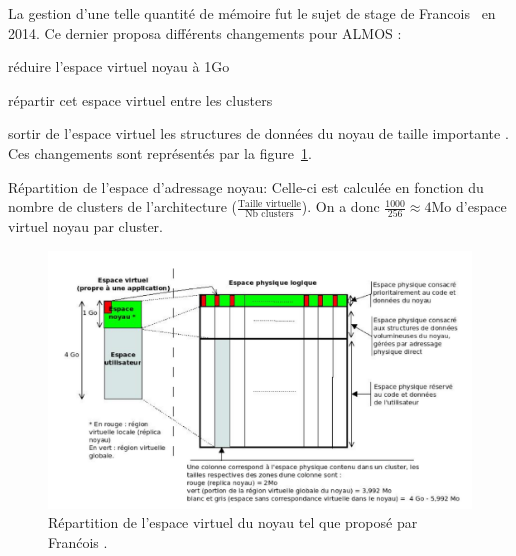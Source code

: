       La gestion d'une telle quantité de mémoire fut le sujet de stage de
      Francois~\citet{guerret2014exploitation} en 2014. Ce dernier proposa
      différents changements pour ALMOS : \benumline \item réduire l'espace
      virtuel noyau à 1Go \item répartir cet espace virtuel entre les
      clusters \item sortir de l'espace virtuel les structures de données du
      noyau de taille importante \eenumline. Ces changements sont représentés
      par la figure~\ref{fig:almos-guerret}.

      \begin{paragraph}{Répartition de l'espace d'adressage noyau:}
        Celle-ci est calculée en fonction du nombre de clusters de
        l'architecture ($\frac{\text{Taille virtuelle}}{\text{Nb
            clusters}}$). On a donc $\frac{1000}{256}\approx4$Mo d'espace
        virtuel noyau par cluster.
      \end{paragraph}

      \begin{figure}[ht]
        \centering \includegraphics[scale=0.3]{include/img/almos-guerret}
        \caption{Répartition de l'espace virtuel du noyau tel que proposé par
          Franćois \citet{guerret2014exploitation}.}
        \label{fig:almos-guerret}
      \end{figure}

